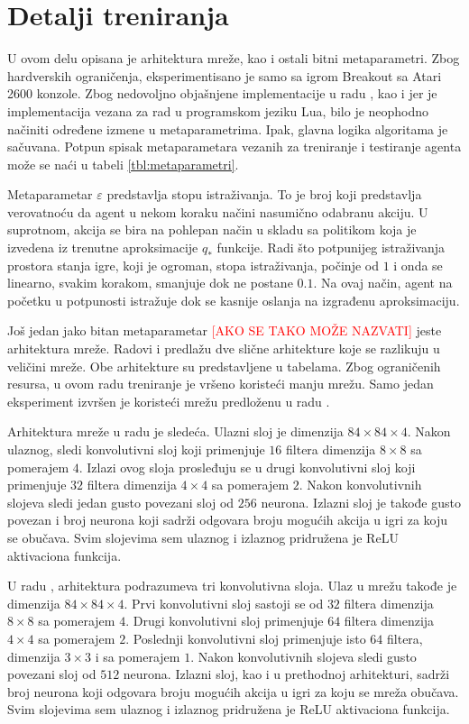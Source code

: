 \section{Detalji treniranja}
\label{sec:treniranje}
U ovom delu opisana je arhitektura mreže, kao i ostali bitni metaparametri. Zbog hardverskih ograničenja, eksperimentisano je samo sa igrom Breakout sa Atari 2600 konzole. Zbog nedovoljno objašnjene implementacije u radu \cite{dqn_mnih}, kao i jer je implementacija vezana za rad \cite{dqn_dm} u programskom jeziku Lua, bilo je neophodno načiniti određene izmene u metaparametrima. Ipak, glavna logika algoritama je sačuvana. Potpun spisak metaparametara vezanih za treniranje i testiranje agenta može se naći u tabeli \ref{tbl:metaparametri}.
\par 
Metaparametar $\varepsilon$ predstavlja stopu istraživanja. To je broj koji predstavlja verovatnoću da agent u nekom koraku načini nasumično odabranu akciju. U suprotnom, akcija se bira na pohlepan način u skladu sa politikom koja je izvedena iz trenutne aproksimacije $q_*$ funkcije. Radi što potpunijeg istraživanja prostora stanja igre, koji je ogroman, stopa istraživanja, počinje od $1$ i onda se linearno, svakim korakom, smanjuje dok ne postane $0.1$. Na ovaj način, agent na početku u potpunosti istražuje dok se kasnije oslanja na izgrađenu aproksimaciju.
\par 
Još jedan jako bitan metaparametar \textcolor{red}{[AKO SE TAKO MOŽE NAZVATI]} jeste arhitektura mreže. Radovi  \cite{dqn_mnih} i \cite{dqn_dm} predlažu dve slične arhitekture koje se razlikuju u veličini mreže. Obe arhitekture su predstavljene u tabelama. Zbog ograničenih resursa, u ovom radu treniranje je vršeno koristeći manju mrežu. Samo jedan eksperiment izvršen je koristeći mrežu predloženu u radu \cite{dqn_dm}.
\par 
Arhitektura mreže u radu \cite{dqn_mnih} je sledeća. Ulazni sloj je dimenzija $84 \times 84 \times 4$. Nakon ulaznog, sledi konvolutivni sloj koji primenjuje $16$ filtera dimenzija $8 \times 8$ sa pomerajem $4$. Izlazi ovog sloja prosleđuju se u drugi konvolutivni sloj koji primenjuje $32$ filtera dimenzija $4 \times 4$ sa pomerajem $2$. Nakon konvolutivnih slojeva sledi jedan gusto povezani sloj od $256$ neurona. Izlazni sloj je takođe gusto povezan i broj neurona koji sadrži odgovara broju mogućih akcija u igri za koju se obučava. Svim slojevima sem ulaznog i izlaznog pridružena je ReLU aktivaciona funkcija.
\par 
U radu \cite{dqn_dm}, arhitektura podrazumeva tri konvolutivna sloja. Ulaz u mrežu takođe je dimenzija $84 \times 84 \times 4$. Prvi konvolutivni sloj sastoji se od $32$ filtera dimenzija $8 \times 8$ sa pomerajem $4$. Drugi konvolutivni sloj primenjuje $64$ filtera dimenzija $4 \times 4$ sa pomerajem $2$. Poslednji konvolutivni sloj primenjuje isto $64$ filtera, dimenzija $3 \times 3$ i sa pomerajem $1$. Nakon konvolutivnih slojeva sledi gusto povezani sloj od $512$ neurona. Izlazni sloj, kao i u prethodnoj arhitekturi, sadrži broj neurona koji odgovara broju mogućih akcija u igri za koju se mreža obučava. Svim slojevima sem ulaznog i izlaznog pridružena je ReLU aktivaciona funkcija.
